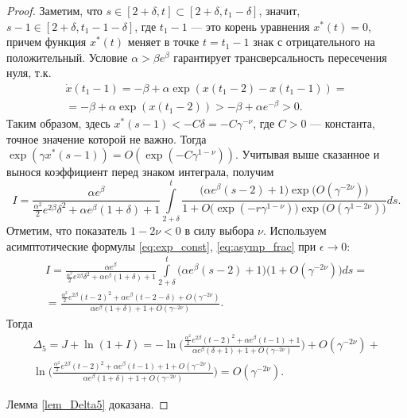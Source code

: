 \begin{proof}
Заметим, что $s \in [2 + \delta, t] \subset [2 + \delta, t_1 - \delta]$, значит, $s - 1 \in [2 + \delta, t_1 - 1 - \delta]$, где $t_1 - 1$ --- это корень уравнения $x^*(t)=0$, причем функция $x^*(t)$ меняет в точке $t = t_1 - 1$ знак с отрицательного на положительный. Условие $\alpha > \beta e^{\beta}$ гарантирует трансверсальность пересечения нуля, т.к.
%
\begin{multline*}
\dot{x}(t_1 - 1) = -\beta + \alpha \exp(x(t_1 - 2) - x(t_1 - 1)) =\\= -\beta + \alpha \exp(x(t_1 - 2)) > -\beta + \alpha e^{-\beta} > 0.
\end{multline*}
%
Таким образом, здесь $x^*(s - 1) < -C \delta = -C \gamma^{-\nu}$, где $C > 0$ --- константа, точное значение которой не важно. Тогда $\exp(\gamma x^*(s - 1))=O(\exp(-C \gamma^{1 - \nu}))$. Учитывая выше сказанное и вынося коэффициент перед знаком интеграла, получим  
\begin{equation*}
	I=\frac{\alpha e^\beta}
	{\frac{\alpha^2}{2}e^{2\beta}\delta^2+\alpha e^{\beta}(1+\delta)+1}
	\int\limits_{2 + \delta}^{t}
	\frac{\big(\alpha e^{\beta}(s-2)+1\big)\exp\big(O(\gamma^{-2\nu})\big)}
	{1+O\big(\exp({-r\gamma^{1-\nu}})\big) \exp\big(O(\gamma^{1-2\nu})\big)}
	ds. 
\end{equation*}
Отметим, что показатель $1-2\nu<0$ в силу выбора $\nu$. Используем асимптотические формулы \eqref{eq:exp_const}, \eqref{eq:asymp_frac} при $\epsilon \to 0$:
%
\begin{multline*}
	I=\frac{\alpha e^\beta}
	{\frac{\alpha^2}{2}e^{2\beta}\delta^2+\alpha e^{\beta}(1+\delta)+1}
	\int\limits_{2 + \delta}^{t}
	\big(\alpha e^{\beta}(s-2)+1\big)\big(1+O(\gamma^{-2\nu})\big)
	ds=
	\\
	= \frac{\frac{\alpha^2}{2} e^{2\beta}(t-2)^2+\alpha e^\beta(t-2-\delta)+O(\gamma^{-2\nu})}
	{\alpha e^{\beta}(1+\delta)+1+O(\gamma^{-2\nu})}.
\end{multline*}
%
Тогда
\begin{multline}
	\Delta_5=J+\ln(1+I)=
	-\ln\Big(\frac{\frac{\alpha^2}{2}e^{2\beta}(t-2)^2+\alpha e^{\beta}(t-1)+1}{\alpha e^{\beta}(\delta+1)+1+O(\gamma^{-2\nu})}\Big)+O(\gamma^{-2\nu})
	+
	\\
	\ln\Big(\frac{\frac{\alpha^2}{2} e^{2\beta}(t-2)^2+\alpha e^\beta(t - 1)+1+O(\gamma^{-2\nu})}
	{\alpha e^{\beta}(1+\delta)+1+O(\gamma^{-2\nu})}\Big)=O(\gamma^{-2\nu}).
\end{multline}        

Лемма \ref{lem_Delta5} доказана.

\end{proof}

